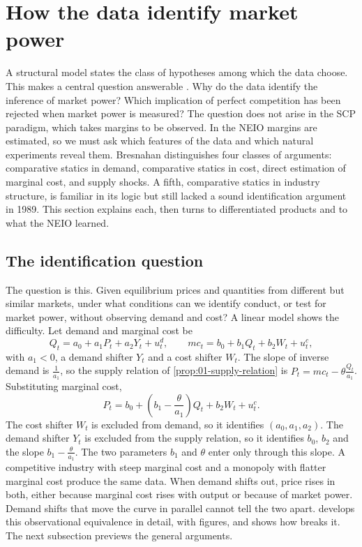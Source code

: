 \section{How the data identify market power}\label{sec:01-identification}

A structural model states the class of hypotheses among which the data choose. This makes a central question
answerable \citep[p.~1031]{Bresnahan1989}. Why do the data identify the inference of market power? Which implication
of perfect competition has been rejected when market power is measured? The question does not arise in the SCP
paradigm, which takes margins to be observed. In the NEIO margins are estimated, so we must ask which features of the
data and which natural experiments reveal them. Bresnahan distinguishes four classes of arguments: comparative statics
in demand, comparative statics in cost, direct estimation of marginal cost, and supply shocks. A fifth, comparative
statics in industry structure, is familiar in its logic but still lacked a sound identification argument in 1989. This
section explains each, then turns to differentiated products and to what the NEIO learned.

\subsection{The identification question}\label{sec:01-id-question}

The question is this. Given equilibrium prices and quantities from different but similar markets, under what conditions
can we identify conduct, or test for market power, without observing demand and cost? A linear model shows the
difficulty. Let demand and marginal cost be
\begin{equation}\label{eq:01-linear-id-model}
Q_t = a_0 + a_1 P_t + a_2 Y_t + u^d_t, \qquad mc_t = b_0 + b_1 Q_t + b_2 W_t + u^c_t ,
\end{equation}
with $a_1 < 0$, a demand shifter $Y_t$ and a cost shifter $W_t$. The slope of inverse demand is $\frac{1}{a_1}$, so the
supply relation of \cref{prop:01-supply-relation} is $P_t = mc_t - \theta\frac{Q_t}{a_1}$. Substituting marginal cost,
\begin{equation}\label{eq:01-linear-supply}
P_t = b_0 + \left(b_1 - \frac{\theta}{a_1}\right) Q_t + b_2 W_t + u^c_t .
\end{equation}
The cost shifter $W_t$ is excluded from demand, so it identifies $(a_0, a_1, a_2)$. The demand shifter $Y_t$ is
excluded from the supply relation, so it identifies $b_0$, $b_2$ and the slope $b_1 - \frac{\theta}{a_1}$. The two
parameters $b_1$ and $\theta$ enter only through this slope. A competitive industry with steep marginal cost and a
monopoly with flatter marginal cost produce the same data. When demand shifts out, price rises in both, either because
marginal cost rises with output or because of market power. Demand shifts that move the curve in parallel cannot tell
the two apart.  develops this observational equivalence in detail, with figures, and shows how
\citet{Bresnahan1982} breaks it. The next subsection previews the general arguments.

